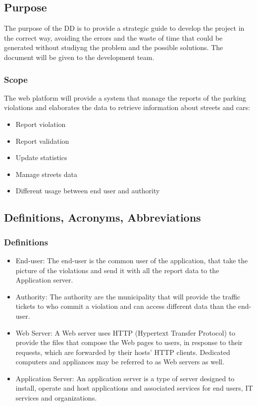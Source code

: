 \subsection{Purpose}
The purpose of the DD is to provide a strategic guide to develop the project in the correct way, avoiding the errors and the waste of time that could be generated without studiyng the problem and the possible solutions. The document will be given to the development team.
\subsubsection{Scope}
The web platform will provide a system that manage the reports of the parking violations and elaborates the data to retrieve information about streets and cars:
\begin{itemize}
	\item
	Report violation
	\item 
	Report validation
	\item
	Update statistics
	\item
	Manage streets data
	\item
	Different usage between end user and authority
\end{itemize}
\subsection{Definitions, Acronyms, Abbreviations}
\subsubsection{Definitions}
\begin{itemize}
	\item 
	End-user: The end-user is the common user of the application, that take the picture of the violations and send it with all the report data to the Application server.
	\item 
	Authority: The authority are the municipality that will provide the traffic tickets to who commit a violation and can access different data than the end-user.
	\item 
	Web Server: A Web server uses HTTP (Hypertext Transfer Protocol) to provide the files that compose the Web pages to users, in response to their requests, which are forwarded by their hosts' HTTP clients. Dedicated computers and appliances may be referred to as Web servers as well.
	\item 
	Application Server: An application server is a type of server designed to install, operate and host applications and associated services for end users, IT services and organizations.
\end{itemize}
